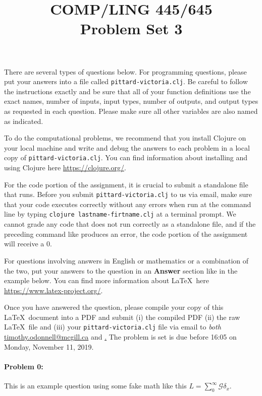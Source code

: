 \documentclass[10pt]{article}
\begin{document}
 
\title{COMP/LING 445/645\\Problem Set 3}
\date{}
\maketitle


There are several types of questions below. For programming questions,
please put your answers into a file called
\texttt{pittard-victoria.clj}. Be careful to follow the instructions
exactly and be sure that all of your function definitions use the
exact names, number of inputs, input types, number of outputs, and
output types as requested in each question. Please make sure all other
variables are also named as indicated.

To do the computational problems, we recommend that you install
Clojure on your local machine and write and debug the answers to each
problem in a local copy of \texttt{pittard-victoria.clj}. You can
find information about installing and using Clojure here
\url{https://clojure.org/}.

For the code portion of the assignment, it is crucial to submit a
standalone file that runs. Before you submit
\texttt{pittard-victoria.clj} to us via email, make sure that your
code executes correctly without any errors when run at the command
line by typing \texttt{clojure lastname-firtname.clj} at a terminal
prompt. We cannot grade any code that does not run correctly as a
standalone file, and if the preceding command like produces an error,
the code portion of the assignment will receive a $0$.

For questions involving answers in English or mathematics or a
combination of the two, put your answers to the question in an
\textbf{Answer} section like in the example below. You can find more
information about \LaTeX\ here \url{https://www.latex-project.org/}.

Once you have answered the question, please compile your copy of this
\LaTeX\ document into a PDF and submit (i) the compiled PDF (ii) the
raw \LaTeX\ file and (iii) your \texttt{pittard-victoria.clj} file
via email to \emph{both}
\href{mailto:timothy.odonnell@mcgill.ca}{timothy.odonnell@mcgill.ca}
and
\href{mailto:savanna.willerton@mail.mcgill.ca}\href{savanna.willerton@mail.mcgill.ca}.
The problem is set is due before 16:05 on Monday, November 11, 2019.

\hrulefill
\paragraph{Problem 0:}
This is an example question using some fake math like this
$L=\sum_0^{\infty} \mathcal{G} \delta_x$.
\end{document}
